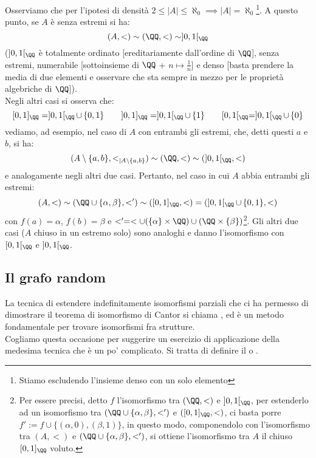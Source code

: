 \documentclass[11pt]{scrartcl}
\begin{document}
\begin{soln}
	Osserviamo che per l'ipotesi di densità $2 \leq |A| \leq \aleph_0 \implies |A| = \aleph_0$\footnote{Stiamo escludendo l'insieme denso con un solo elemento}. A questo punto, se $A$ è senza estremi si ha:
	\[ (A,<) \sim (\QQ,<) \sim ]0,1[_\QQ
		\]
	($]0,1[_\QQ$ è totalmente ordinato [ereditariamente dall'ordine di $\QQ$], senza estremi, numerabile [sottoinsieme di $\QQ$ + $n \mapsto \frac 1n$] e denso [basta prendere la media di due elementi e osservare che sta sempre in mezzo per le proprietà algebriche di $\QQ$]).\\
	Negli altri casi si osserva che:
	\[ [0,1]_{\QQ} = ]0,1[_{\QQ} \,\cup\, \{0,1\}  \qquad ]0,1]_{\QQ} = ]0,1[_{\QQ} \,\cup\, \{1\} \qquad [0,1[_{\QQ} = ]0,1[_{\QQ} \,\cup\, \{0\}
		\]
	vediamo, ad esempio, nel caso di $A$ con entrambi gli estremi, che, detti questi $a$ e $b$, si ha:
	\[ (A\setminus\{a,b\},<_{|A\setminus\{a,b\}}) \sim (\QQ,<) \sim (]0,1[_{\QQ},<)
		\]
	e analogamente negli altri due casi. Pertanto, nel caso in cui $A$ abbia entrambi gli estremi:
	\[ (A,<) \sim (\QQ\cup\{\alpha,\beta\},<') \sim ([0,1]_\QQ,<) = (]0,1[_{\QQ} \,\cup\, \{0,1\},<)
		\]
	con $f(a) = \alpha$, $f(b) = \beta$ e $<' = < \cup (\{\alpha\} \times \QQ) \cup (\QQ \times \{\beta\})$\footnote{Per essere precisi,
	detto $f$ l'isomorfismo tra $(\QQ,<)$ e $]0,1[_{\QQ}$, per estenderlo ad un isomorfismo tra $(\QQ \cup \{\alpha,\beta\},<')$ e $([0,1]_\QQ,<)$, ci basta porre $f' := f \cup \{(\alpha,0),(\beta,1)\}$,
	in questo modo, componendolo con l'isomorfismo tra $(A,<)$ e $(\QQ\cup\{\alpha,\beta\},<')$, si ottiene l'isomorfismo tra $A$ il chiuso $[0,1]_\QQ$ voluto.}. Gli altri due casi ($A$ chiuso in un estremo solo) sono analoghi e danno l'isomorfismo 
	con $[0,1[_{\QQ}$ e $]0,1[_{\QQ}$.
\end{soln}

\subsection{Il grafo random}

La tecnica di estendere indefinitamente isomorfismi parziali che ci ha permesso di dimostrare il teorema di isomorfismo di Cantor
si chiama , ed è un metodo fondamentale per trovare isomorfismi fra strutture.\\
Cogliamo questa occasione per suggerire un esercizio di applicazione della medesima tecnica che è un po' complicato. Si tratta di definire il 
o .
\end{document}
